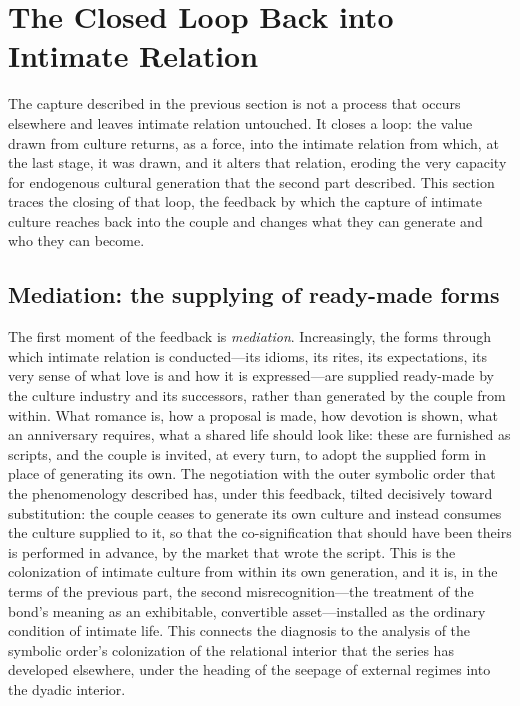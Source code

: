 \section{The Closed Loop Back into Intimate Relation}
\label{p24:sec:feedback}

\noindent
The capture described in the previous section is not a process that occurs elsewhere and leaves intimate relation untouched. It closes a loop: the value drawn from culture returns, as a force, into the intimate relation from which, at the last stage, it was drawn, and it alters that relation, eroding the very capacity for endogenous cultural generation that the second part described. This section traces the closing of that loop, the feedback by which the capture of intimate culture reaches back into the couple and changes what they can generate and who they can become.

\subsection*{Mediation: the supplying of ready-made forms}

The first moment of the feedback is \emph{mediation}. Increasingly, the forms through which intimate relation is conducted---its idioms, its rites, its expectations, its very sense of what love is and how it is expressed---are supplied ready-made by the culture industry and its successors, rather than generated by the couple from within. What romance is, how a proposal is made, how devotion is shown, what an anniversary requires, what a shared life should look like: these are furnished as scripts, and the couple is invited, at every turn, to adopt the supplied form in place of generating its own. The negotiation with the outer symbolic order that the phenomenology described has, under this feedback, tilted decisively toward substitution: the couple ceases to generate its own culture and instead consumes the culture supplied to it, so that the co-signification that should have been theirs is performed in advance, by the market that wrote the script. This is the colonization of intimate culture from within its own generation, and it is, in the terms of the previous part, the second misrecognition---the treatment of the bond's meaning as an exhibitable, convertible asset---installed as the ordinary condition of intimate life. This connects the diagnosis to the analysis of the symbolic order's colonization of the relational interior that the series has developed elsewhere, under the heading of the seepage of external regimes into the dyadic interior.

